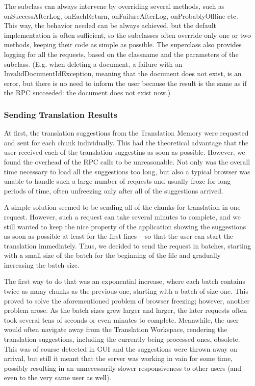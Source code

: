 The subclass can always intervene by overriding several methods, such as onSuccessAfterLog, onEachReturn, onFailureAfterLog, onProbablyOffline etc. This way, the behavior needed can be always achieved, but the default implementation is often sufficient, so the subclasses often override only one or two methods, keeping their code as simple as possible. The superclass also provides logging for all the requests, based on the classname and the parameters of the subclass.
(E.g. when deleting a document, a failure with an InvalidDocumentIdException, meaning that the document does not exist, is an error, but there is no need to inform the user because the result is the same as if the RPC succeeded: the document does not exist now.)

\subsubsection{Sending Translation Results}

At first, the translation suggestions from the Translation Memory were requested and sent for each chunk individually. This had the theoretical advantage that the user received each of the translation suggestins as soon as possible. However, we found the overhead of the RPC calls to be unreasonable. Not only was the overall time necessary to load all the suggestions too long, but also a typical browser was unable to handle such a large number of requests and usually froze for long periods of time, often unfreezing only after all of the suggestions arrived.

A simple solution seemed to be sending all of the chunks for translation in one request. However, such a request can take several minutes to complete, and we still wanted to keep the nice property of the application showing the suggestions as soon as possible at least for the first lines -- so that the user can start the translation immediately. Thus, we decided to send the request in batches, starting with a small size of the batch for the beginning of the file and gradually increasing the batch size.

The first way to do that was an exponential increase, where each batch contains twice as many chunks as the previous one, starting with a batch of size one. This proved to solve the aforementioned problem of browser freezing; however, another problem arose. As the batch sizes grew larger and larger, the later requests often took several tens of seconds or even minutes to complete. Meanwhile, the user would often navigate away from the Translation Workspace, rendering the translation suggestions, including the currently being processed ones, obsolete. This was of course detected in GUI and the suggestions were thrown away on arrival, but still it meant that the server was working in vain for some time, possibly resulting in an unnecessarily slower responsiveness to other users (and even to the very same user as well).


